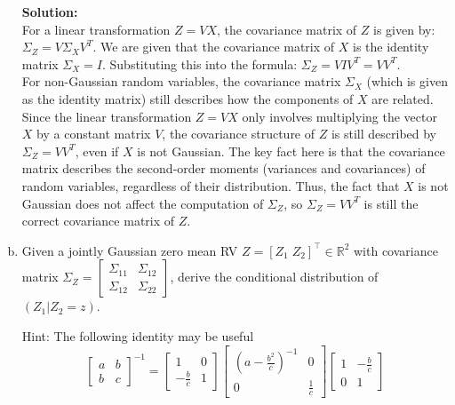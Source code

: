 \documentclass{article}
\newenvironment{solution}{\color{blue} \smallskip \textbf{Solution:}}{}
\begin{document}
\begin{enumerate}[(a)]
    \begin{solution}\\
For a linear transformation \(Z = V X\), the covariance matrix of \(Z\) is given by: \(\Sigma_Z = V \Sigma_X V^T\). We are given that the covariance matrix of \(X\) is the identity matrix \(\Sigma_X = I\). Substituting this into the formula: \(\Sigma_Z = V I V^T = V V^T\).\\

For non-Gaussian random variables, the covariance matrix \(\Sigma_X\) (which is given as the identity matrix) still describes how the components of \(X\) are related. Since the linear transformation \(Z = V X\) only involves multiplying the vector \(X\) by a constant matrix \(V\), the covariance structure of \(Z\) is still described by \(\Sigma_Z = V V^T\), even if \(X\) is not Gaussian. The key fact here is that the covariance matrix describes the second-order moments (variances and covariances) of random variables, regardless of their distribution. Thus, the fact that \(X\) is not Gaussian does not affect the computation of \(\Sigma_Z\), so \(\Sigma_Z = V V^T\) is still the correct covariance matrix of \(Z\).


    \end{solution}

    \newpage
    \item Given a jointly Gaussian zero mean RV $Z = [Z_1\; Z_2]^\top\in \mathbb{R}^2$ with covariance matrix $\Sigma_Z = \begin{bmatrix} \Sigma_{11} & \Sigma_{12} \\ \Sigma_{12} & \Sigma_{22}\end{bmatrix}$, derive the conditional distribution of $(Z_1 | Z_2 = z)$.

    Hint: The following identity may be useful 
    \[
        \begin{bmatrix} a & b \\ b & c\end{bmatrix}^{-1} = \begin{bmatrix} 1 & 0 \\ -\frac{b}{c} & 1\end{bmatrix} \begin{bmatrix} \left(a - \frac{b^2}{c}\right)^{-1} & 0 \\ 0 & \frac{1}{c} \end{bmatrix}
        \begin{bmatrix} 1 &  -\frac{b}{c} \\ 0 & 1\end{bmatrix}
    \]


\end{enumerate}
\end{document}
